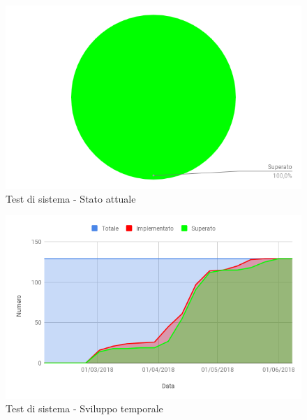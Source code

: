 			\begin{figure}[H]{\textwidth}
  				\centering
  				\includegraphics[width=0.7\linewidth]{./img/Test/testSistema.png}
	  			\caption{Test di sistema - Stato attuale}
			\end{figure}
			
			\begin{figure}[H]{\textwidth}
  				\centering
  				\includegraphics[width=1\linewidth]{./img/Test/sviluppoSistema.png}
	  			\caption{Test di sistema - Sviluppo temporale}
			\end{figure}